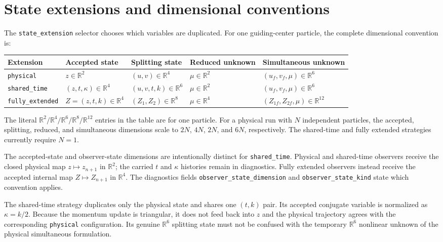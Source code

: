 \documentclass[11pt,a4paper]{article}
\newcommand{\R}{\mathbb{R}}
\begin{document}
\section{State extensions and dimensional conventions}

The \texttt{state\_extension} selector chooses which variables are duplicated.
For one guiding-center particle, the complete dimensional convention is:

\begin{center}
\footnotesize
\begin{tabular}{@{}>{\raggedright\arraybackslash}p{}
                    >{\raggedright\arraybackslash}p{}
                    >{\raggedright\arraybackslash}p{}
                    >{\raggedright\arraybackslash}p{}
                    >{\raggedright\arraybackslash}p{}@{}}
\toprule
Extension & Accepted state & Splitting state & Reduced unknown & Simultaneous unknown \\
\midrule
\texttt{physical}
  & $z\in\R^2$
  & $(u,v)\in\R^4$
  & $\mu\in\R^2$
  & $(u_f,v_f,\mu)\in\R^6$ \\
\texttt{shared\_time}
  & $(z,t,\kappa)\in\R^4$
  & $(u,v,t,k)\in\R^6$
  & $\mu\in\R^2$
  & $(u_f,v_f,\mu)\in\R^6$ \\
\texttt{fully\_extended}
  & $Z=(z,t,k)\in\R^4$
  & $(Z_1,Z_2)\in\R^8$
  & $\mu\in\R^4$
  & $(Z_{1f},Z_{2f},\mu)\in\R^{12}$ \\
\bottomrule
\end{tabular}
\end{center}

The literal $\R^2/\R^4/\R^6/\R^8/\R^{12}$ entries in the table are for one
particle.  For a physical run with $N$ independent particles, the accepted,
splitting, reduced, and simultaneous dimensions scale to $2N$, $4N$, $2N$,
and $6N$, respectively.  The shared-time and fully extended strategies
currently require $N=1$.

The accepted-state and observer-state dimensions are intentionally distinct
for \texttt{shared\_time}.  Physical and shared-time observers receive the
closed physical map $z\mapsto z_{n+1}$ in $\R^2$; the carried $t$ and
$\kappa$ histories remain in diagnostics.  Fully extended observers instead
receive the accepted internal map $Z\mapsto Z_{n+1}$ in $\R^4$.  The
diagnostics fields \texttt{observer\_state\_dimension} and
\texttt{observer\_state\_kind} state which convention applies.

The shared-time strategy duplicates only the physical state and shares one
$(t,k)$ pair.  Its accepted conjugate variable is normalized as $\kappa=k/2$.
Because the momentum update is triangular, it does not feed back into $z$ and
the physical trajectory agrees with the corresponding \texttt{physical}
configuration.  Its genuine $\R^6$ splitting state must not be confused with
the temporary $\R^6$ nonlinear unknown of the physical simultaneous
formulation.
\end{document}
